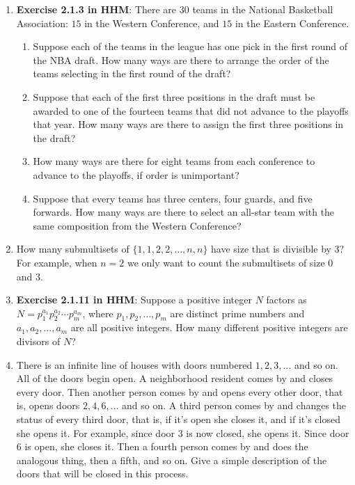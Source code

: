 \documentclass[11pt]{article}
\begin{document}
\begin{enumerate}

\item \textbf{Exercise 2.1.3 in HHM}: There are $30$ teams in the National Basketball Association: $15$ in the Western Conference, and $15$ in the Eastern Conference.
\begin{enumerate}

\item Suppose each of the teams in the league has one pick in the first round of the NBA draft.  How many ways are there to arrange the order of the teams selecting in the first round of the draft?

\item Suppose that each of the first three positions in the draft must be awarded to one of the fourteen teams that did not advance to the playoffs that year.  How many ways are there to assign the first three positions in the draft?

\item How many ways are there for eight teams from each conference to advance to the playoffs, if order is unimportant?
 
\item Suppose that every teams has three centers, four guards, and five forwards.  How many ways are there to select an all-star team with the same composition from the Western Conference?

\end{enumerate}

\item How many submultisets of $\{1,1,2,2,\ldots, n, n\}$ have size that is divisible by $3$?  \\
For example, when $n = 2$ we only want to count the submultisets of size $0$ and $3$.

\item \textbf{Exercise 2.1.11 in HHM}: Suppose a positive integer $N$ factors as $N = p_1^{a_1}p_2^{a_2}\cdots p_m^{a_m}$, where $p_1,p_2,\ldots, p_m$ are distinct prime numbers and $a_1, a_2,\ldots, a_m$ are all positive integers.  How many different positive integers are divisors of $N$?

\item There is an infinite line of houses with doors numbered $1,2,3,\ldots$ and so on.  All of the doors begin open.  A neighborhood resident comes by and closes every door.  Then another person comes by and opens every other door, that is, opens doors $2,4,6,\ldots$ and so on.  A third person comes by and changes the status of every third door, that is, if it's open she closes it, and if it's closed she opens it.  For example, since door 3 is now closed, she opens it.  Since door 6 is open, she closes it.  Then a fourth person comes by and does the analogous thing, then a fifth, and so on.  Give a simple description of the doors that will be closed in this process.


\end{enumerate}
\end{document}
